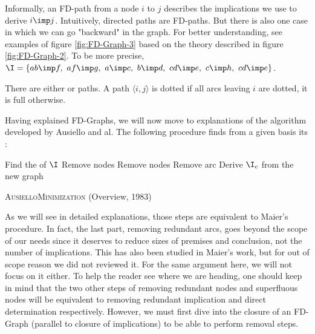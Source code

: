 \noindent Informally, an FD-path from a node $i$ to $j$ describes the 
implications we use to derive $i \imp j$. Intuitively, 
directed paths are FD-paths. But there is also one case in which
we can go "backward" in the graph. For better understanding, see examples of
figure \ref{fig:FD-Graph-3} based on the theory described in figure 
\ref{fig:FD-Graph-2}. To be more precise, $\I = \{ ab \imp f, \ af \imp g,
\ a \imp c, \ b \imp d, \ cd \imp e, \ c \imp h, \ cd \imp e \}$.

\begin{center}
	
\end{center}

There are either  or  paths. A path $\langle i, j
\rangle$ is dotted if all arcs leaving $i$ are dotted, it is full otherwise.

\begin{center}
	
\end{center}

\vspace{1.2em}

Having explained FD-Graphs, we will now move to explanations of the algorithm
developed by Ausiello and al. The following procedure finds from a given basis 
its : 

\begin{algorithm}[H]
	
	\BlankLine
	\BlankLine
	
	Find the  of $\I$ \;
	Remove  nodes \;
	Remove  nodes \;
	Remove  arc \;
	Derive $\I_c$ from the new graph \;
	
	\caption{\textsc{AusielloMinimization} (Overview, 1983)}
\end{algorithm}

\vspace{1.2em}

As we will see in detailed explanations, those steps are equivalent to Maier's
procedure. In fact, the last part, removing redundant arcs, goes beyond the 
scope of our needs since it deserves to reduce sizes of premises and 
conclusion, not the number of implications. This has also been studied in 
Maier's work, but for out of scope reason we did not reviewed it. For the same
argument here, we will not focus on it either. To help the reader see where we 
are heading, one should keep in mind that the two other steps of removing 
redundant nodes and superfluous nodes will be equivalent to removing redundant 
implication and direct determination respectively. However, we must first
dive into the closure of an FD-Graph (parallel to closure of implications) to
be able to perform removal steps.

